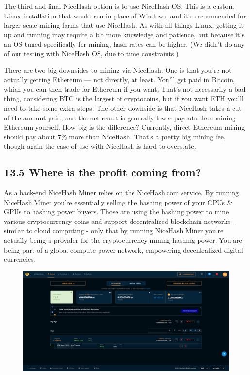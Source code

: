 The third and final NiceHash option is to use NiceHash OS. This is a custom Linux installation that would run in place of Windows, and it's recommended for larger scale mining farms that use NiceHash. As with all things Linux, getting it up and running may require a bit more knowledge and patience, but because it's an OS tuned specifically for mining, hash rates can be higher. (We didn't do any of our testing with NiceHash OS, due to time constraints.)\vspace{.3cm}

There are two big downsides to mining via NiceHash. One is that you're not actually getting Ethereum — not directly, at least. You'll get paid in Bitcoin, which you can then trade for Ethereum if you want. That's not necessarily a bad thing, considering BTC is the largest of cryptocoins, but if you want ETH you'll need to take some extra steps. The other downside is that NiceHash takes a cut of the amount paid, and the net result is generally lower payouts than mining Ethereum yourself. How big is the difference? Currently, direct Ethereum mining should pay about 7\% more than NiceHash. That's a pretty big mining fee, though again the ease of use with NiceHash is hard to overstate.\vspace{.3cm}

\subsection*{13.5 Where is the profit coming from?}
As a back-end NiceHash Miner relies on the NiceHash.com service. By running NiceHash Miner you're essentially selling the hashing power of your CPUs \& GPUs to hashing power buyers. Those are using the hashing power to mine various cryptocurrency coins and support decentralized blockchain networks - similar to cloud computing - only that by running NiceHash Miner you're actually being a provider for the cryptocurrency mining hashing power. You are being part of a global compute power network, empowering decentralized digital currencies.
\begin{figure}[h]
	\centering
	\includegraphics[width=1\linewidth]{"images/Screenshot (15)"}
	\captionsetup{labelformat=empty}
	\caption{}
\end{figure}
\pagebreak
